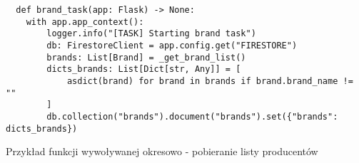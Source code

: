 \begin{code}[H]
  \begin{verbatim}
  def brand_task(app: Flask) -> None:
    with app.app_context():
        logger.info("[TASK] Starting brand task")
        db: FirestoreClient = app.config.get("FIRESTORE")
        brands: List[Brand] = _get_brand_list()
        dicts_brands: List[Dict[str, Any]] = [
            asdict(brand) for brand in brands if brand.brand_name != ""
        ]
        db.collection("brands").document("brands").set({"brands": dicts_brands})
  \end{verbatim}
  \caption{Przykład funkcji wywoływanej okresowo - pobieranie listy producentów}
  \label{brand_task}
\end{code}
